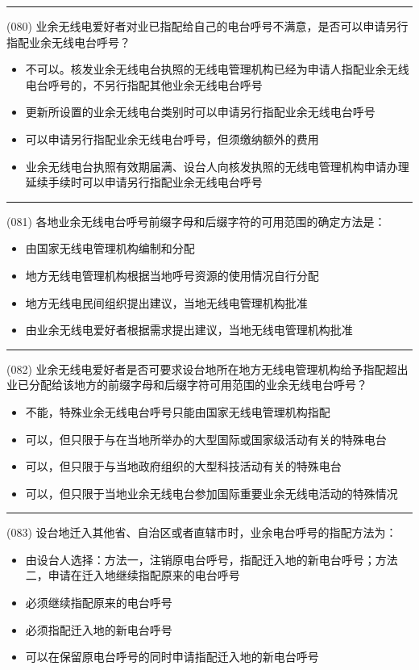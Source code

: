 \documentclass[twocolumn]{ctexart}  %
\begin{document}
\noindent\rule{0.5\textwidth}{1pt}
\heiti (080) 业余无线电爱好者对业已指配给自己的电台呼号不满意，是否可以申请另行指配业余无线电台呼号？ \songti {\color{gray} [LK0081] }
\begin{itemize}
	\item  不可以。核发业余无线电台执照的无线电管理机构已经为申请人指配业余无线电台呼号的，不另行指配其他业余无线电台呼号
	\item  更新所设置的业余无线电台类别时可以申请另行指配业余无线电台呼号
	\item  可以申请另行指配业余无线电台呼号，但须缴纳额外的费用
	\item  业余无线电台执照有效期届满、设台人向核发执照的无线电管理机构申请办理延续手续时可以申请另行指配业余无线电台呼号
\end{itemize}


\noindent\rule{0.5\textwidth}{1pt}
\heiti (081) 各地业余无线电台呼号前缀字母和后缀字符的可用范围的确定方法是： \songti {\color{gray} [LK0082] }
\begin{itemize}
	\item  由国家无线电管理机构编制和分配
	\item  地方无线电管理机构根据当地呼号资源的使用情况自行分配
	\item  地方无线电民间组织提出建议，当地无线电管理机构批准
	\item  由业余无线电爱好者根据需求提出建议，当地无线电管理机构批准
\end{itemize}


\noindent\rule{0.5\textwidth}{1pt}
\heiti (082) 业余无线电爱好者是否可要求设台地所在地方无线电管理机构给予指配超出业已分配给该地方的前缀字母和后缀字符可用范围的业余无线电台呼号？ \songti {\color{gray} [LK0083] }
\begin{itemize}
	\item  不能，特殊业余无线电台呼号只能由国家无线电管理机构指配
	\item  可以，但只限于与在当地所举办的大型国际或国家级活动有关的特殊电台
	\item  可以，但只限于与当地政府组织的大型科技活动有关的特殊电台
	\item  可以，但只限于当地业余无线电台参加国际重要业余无线电活动的特殊情况
\end{itemize}


\noindent\rule{0.5\textwidth}{1pt}
\heiti (083) 设台地迁入其他省、自治区或者直辖市时，业余电台呼号的指配方法为： \songti {\color{gray} [LK0091] }
\begin{itemize}
	\item  由设台人选择：方法一，注销原电台呼号，指配迁入地的新电台呼号；方法二，申请在迁入地继续指配原来的电台呼号
	\item  必须继续指配原来的电台呼号
	\item  必须指配迁入地的新电台呼号
	\item  可以在保留原电台呼号的同时申请指配迁入地的新电台呼号
\end{itemize}
\end{document}
